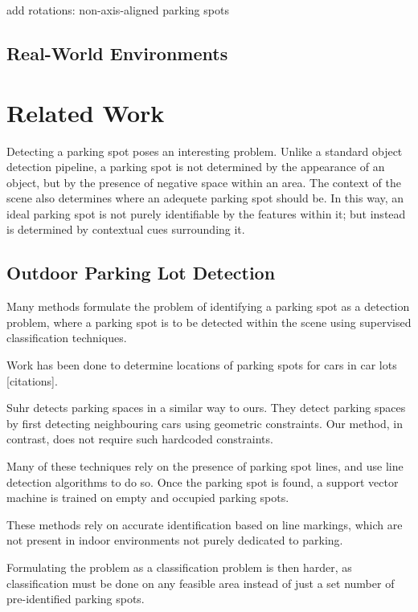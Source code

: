 add rotations:
non-axis-aligned parking spots

\subsection{Real-World Environments}

\section{Related Work}
\label{sec:parkinglotidentificationlitreview}
Detecting a parking spot poses an interesting problem. Unlike a standard object
detection pipeline, a parking spot is not determined by the appearance of an
object, but by the presence of negative space within an area. The context of the
scene also determines where an adequete parking spot should be. In this way, an
ideal parking spot is not purely identifiable by the features within it; but
instead is determined by contextual cues surrounding it.


\subsection{Outdoor Parking Lot Detection}

Many methods formulate the problem of identifying a parking spot
as a detection problem, where a parking spot is to be detected within the scene
using supervised classification techniques.

Work has been done to determine locations of parking spots for cars in car lots
[citations]. 
\cite{wu2006parking, true2007vacant}

Suhr \cite{suhr2010automatic} detects parking spaces in a similar way to ours.
They detect parking spaces by first detecting neighbouring cars using geometric
constraints. Our method, in contrast, does not require such hardcoded
constraints.


Many of these techniques rely on the presence of parking spot
lines, and use line detection algorithms to do so. Once the parking spot is
found, a support vector machine is trained on empty and occupied parking spots.

These methods rely on accurate identification based on line markings, which are
not present in indoor environments not purely dedicated to parking. 

Formulating the problem as a classification problem is then harder, as
classification must be done on any feasible area instead of just a set number of
pre-identified parking spots.


